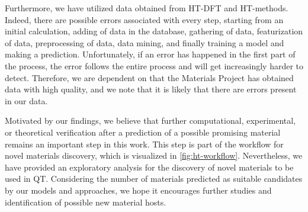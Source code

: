 Furthermore, we have utilized data obtained from HT-DFT and HT-methods. Indeed, there are possible errors associated with every step, starting from an initial calculation, adding of data in the database, gathering of data, featurization of data, preprocessing of data, data mining, and finally training a model and making a prediction. Unfortunately, if an error has happened in the first part of the process, the error follows the entire process and will get increasingly harder to detect. Therefore, we are dependent on that the Materials Project has obtained data with high quality, and we note that it is likely that there are errors present in our data. %

Motivated by our findings, we believe that further computational, experimental, or theoretical verification after a prediction of a possible promising material remains an important step in this work. This step is part of the workflow for novel materials discovery, which is visualized in \autoref{fig:ht-workflow}. Nevertheless, we have provided an exploratory analysis for the discovery of novel materials to be used in QT. Considering the number of materials predicted as suitable candidates by our models and approaches, we hope it encourages further studies and identification of possible new material hosts.

